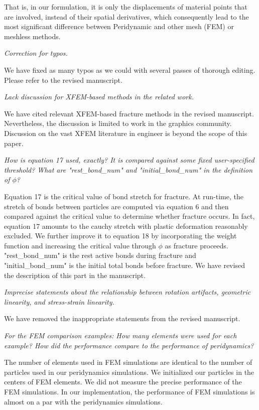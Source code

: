 That is, in our formulation, it is only the displacements of material points that are involved,
instead of their spatial derivatives, which consequently lead to the most significant difference between Peridynamic and other mesh (FEM) or meshless methods.

\emph{Correction for typos.}

We have fixed as many typos as we could with several passes of thorough editing. Please refer to the revised manuscript.

\emph{Lack discussion for XFEM-based methods in the related work.}

We have cited relevant XFEM-based fracture methods in the revised manuscript. Nevertheless, the discussion is limited to work in the graphics community. Discussion on the vast XFEM literature in engineer is beyond the scope of this paper.

\emph{How is equation 17 used, exactly? It is compared against some fixed user-specified threshold? What are "rest\_bond\_num" and "initial\_bond\_num" in the definition of $\phi$?}

Equation 17 is the critical value of bond stretch for fracture. At run-time, the stretch of bonds between particles are computed via equation 6 and then compared against the critical value to determine whether fracture occurs.
 In fact, equation 17 amounts to the cauchy stretch with plastic deformation reasonably excluded. We further improve it to equation 18 by incorporating the weight function and increasing the critical value through $\phi$ as fracture proceeds. "rest\_bond\_num" is the rest active bonds during fracture and "initial\_bond\_num" is the initial total bonds before fracture. We have revised the description of this part in the manuscript.

\emph{Imprecise statements about the relationship between rotation artifacts, geometric linearity, and stress-strain linearity.}

We have removed the inappropriate statements from the revised manuscript.

\emph{For the FEM comparison examples: How many elements were used for each example? How did the performance compare to the performance of peridynamics?}

The number of elements used in FEM simulations are identical to the number of particles used in our peridynamics simulations. We initialized our particles in the centers of FEM elements. We did not measure the precise performance of the FEM simulations. In our implementation, the performance of FEM simulations is almost on a par with the peridynamics simulations.

